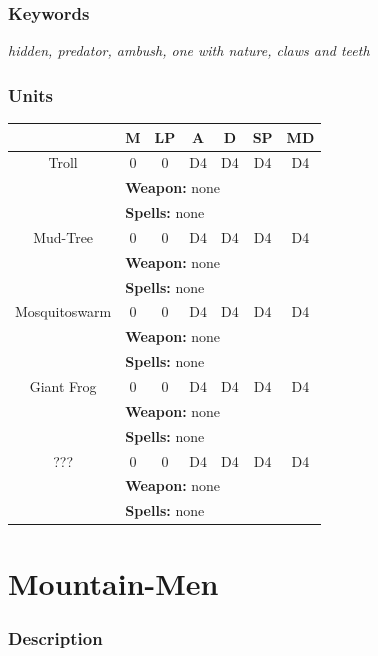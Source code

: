 \documentclass[a5paper,pagesize,10pt,bibtotoc,pointlessnumbers,
normalheadings,DIV=9,twoside=false]{scrbook}
\begin{document}
\subsubsection{Keywords}
\emph{hidden, predator, ambush, one with nature, claws and teeth}

\subsubsection{Units}

 \begin{tabular}{||c c c c c c c||} 
 \hline
  & M & LP & A & D & SP & MD \\
 \hline\hline
 Troll & 0 & 0 & D4 & D4 & D4 & D4 \\ 
  & \multicolumn{6}{l||}{\textbf{Weapon:} none} \\
  & \multicolumn{6}{l||}{\textbf{Spells:} none} \\
 \hline
 Mud-Tree & 0 & 0 & D4 & D4 & D4 & D4 \\
  & \multicolumn{6}{l||}{\textbf{Weapon:} none} \\
  & \multicolumn{6}{l||}{\textbf{Spells:} none} \\
 \hline
 Mosquitoswarm & 0 & 0 & D4 & D4 & D4 & D4 \\
  & \multicolumn{6}{l||}{\textbf{Weapon:} none} \\
  & \multicolumn{6}{l||}{\textbf{Spells:} none} \\
\hline
 Giant Frog & 0 & 0 & D4 & D4 & D4 & D4 \\
  & \multicolumn{6}{l||}{\textbf{Weapon:} none} \\
  & \multicolumn{6}{l||}{\textbf{Spells:} none} \\
\hline
 ??? & 0 & 0 & D4 & D4 & D4 & D4 \\
  & \multicolumn{6}{l||}{\textbf{Weapon:} none} \\
  & \multicolumn{6}{l||}{\textbf{Spells:} none} \\
\hline
\end{tabular}


\newpage
\section{Mountain-Men}

\subsubsection{Description}
\end{document}

